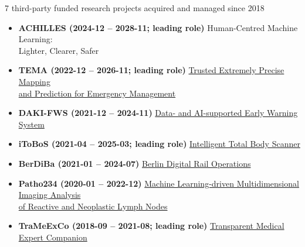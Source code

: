 
\ifdefined\shortcv
    {\hspace*{\fill} 7 third-party funded research projects acquired and managed since 2018}
\else
    \begin{itemize}
        \item [] \textbf{ACHILLES (2024-12 -- 2028-11; leading role)}
                    \hspace*{\fill} Human-Centred Machine Learning:\\
                    \hspace*{\fill}   Lighter, Clearer, Safer

        \item [] \textbf{TEMA (2022-12 -- 2026-11; leading role)}
                \href{https://www.hhi.fraunhofer.de/en/departments/ai/projects/tema.html}{
                    \hspace*{\fill} Trusted Extremely Precise Mapping\\
                    \hspace*{\fill}  and Prediction for Emergency Management}

        \item [] \textbf{DAKI-FWS (2021-12 -- 2024-11)}
                \href{https://www.hhi.fraunhofer.de/en/departments/ai/projects/daki-fws.html}{\hspace*{\fill} Data- and AI-supported Early Warning System}
    
        \item [] \textbf{iToBoS (2021-04 -- 2025-03; leading role)}
                \href{https://www.hhi.fraunhofer.de/en/departments/ai/projects/itobos.html}{\hspace*{\fill} Intelligent Total Body Scanner}

        \item [] \textbf{BerDiBa (2021-01 -- 2024-07)}
                \href{https://www.hhi.fraunhofer.de/en/departments/ai/projects/berdiba.html}{\hspace*{\fill} Berlin Digital Rail Operations}


        \item [] \textbf{Patho234 (2020-01 -- 2022-12)}
                \href{https://www.hhi.fraunhofer.de/en/departments/ai/projects/patho234.html}{
                    \hspace*{\fill} Machine Learning-driven Multidimensional Imaging Analysis\\
                    \hspace*{\fill} of Reactive  and Neoplastic Lymph Nodes}

        \item [] \textbf{TraMeExCo (2018-09 -- 2021-08; leading role)}
                \href{https://www.hhi.fraunhofer.de/en/departments/ai/projects/trameexco.html}{\hspace*{\fill}Transparent Medical Expert Companion}

    \end{itemize}
\fi